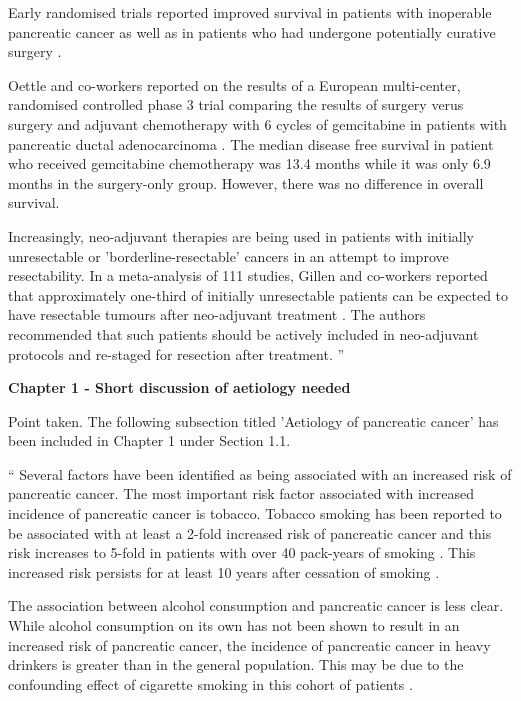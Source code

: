 	Early randomised trials reported improved survival in patients with inoperable pancreatic cancer \parencite{mallinson_chemotherapy_1980} as well as in patients who had undergone potentially curative surgery \parencite{bakkevold_adjuvant_1993}. 
	
	Oettle and co-workers reported on the results of a European multi-center, randomised controlled phase 3 trial comparing the results of surgery verus surgery and adjuvant chemotherapy with 6 cycles of gemcitabine in patients with pancreatic ductal adenocarcinoma \parencite{oettle_adjuvant_2007}. 
	The median disease free survival in patient who received gemcitabine chemotherapy was 13.4 months while it was only 6.9 months in the surgery-only group. 
	However, there was no difference in overall survival.
	
	Increasingly, neo-adjuvant therapies are being used in patients with initially unresectable or 'borderline-resectable' cancers in an attempt to improve resectability. 
	In a meta-analysis of 111 studies, Gillen and co-workers reported that approximately one-third of initially unresectable patients can be expected to have resectable tumours after neo-adjuvant treatment \parencite{gillen_preoperative/neoadjuvant_2010}. 
	The authors recommended that such patients should be actively included in neo-adjuvant protocols and re-staged for resection after treatment.
	\textquotedblright
		
\textbf{Chapter 1 - Short discussion of aetiology needed}
	
	Point taken. The following subsection titled 'Aetiology of pancreatic cancer' has been included in Chapter 1 under Section 1.1.
	
	\textquotedblleft
	Several factors have been identified as being associated with an increased risk of pancreatic cancer.
	The most important risk factor associated with increased incidence of pancreatic cancer is tobacco. 
	Tobacco smoking has been reported to be associated with at least a 2-fold increased risk of pancreatic cancer and this risk increases to 5-fold in patients with over 40 pack-years of smoking \parencite{raimondi_early_2007, iodice_tobacco_2008}. 
	This increased risk persists for at least 10 years after cessation of smoking \parencite{iodice_tobacco_2008}.
	
	The association between alcohol consumption and pancreatic cancer is less clear. 
	While alcohol consumption on its own has not been shown to result in an increased risk of pancreatic cancer, the incidence of pancreatic cancer in heavy drinkers is greater than in the general population.
	This may be due to the confounding effect of cigarette smoking in this cohort of patients \parencite{jiao_alcohol_2009, rohrmann_ethanol_2009}.
	
